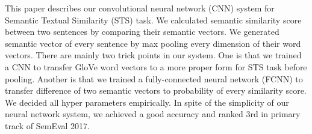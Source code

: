 This paper describes our convolutional neural network (CNN) system for Semantic Textual Similarity (STS) task. We calculated semantic similarity score between two sentences by comparing their semantic vectors. We generated semantic vector of every sentence by max pooling every dimension of their word vectors. There are mainly two trick points in our system. One is that we trained a CNN to transfer GloVe word vectors to a more proper form for STS task before pooling. Another is that we trained a fully-connected neural network (FCNN) to transfer difference of two semantic vectors to probability of every similarity score. We decided all hyper parameters empirically. In spite of the simplicity of our neural network system, we achieved a good accuracy and ranked 3rd in primary track of SemEval 2017.
